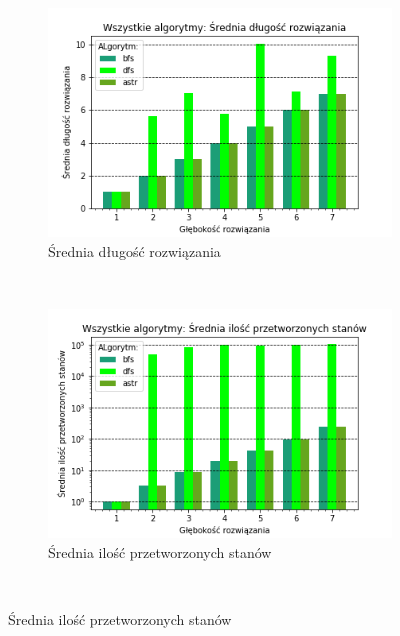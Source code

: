 \documentclass{classrep}
\begin{document}
\begin{figure}[H]
    \centering
    \begin{subfigure}[t]{0.2\textlength}
        \includegraphics[width=\textwidth]{charts/ALL_path_length.png}
        \caption{Średnia długość rozwiązania}
        \label{ALL:path_length}
    \end{subfigure}
    ~ %
    \begin{subfigure}[t]{0.45\textwidth}
        \includegraphics[width=\textwidth]{charts/ALL_processed.png}
        \caption{Średnia ilość przetworzonych stanów}
        \label{ALL:processed}
    \end{subfigure}
    \qquad
    ~ %

\end{figure}
\end{document}
